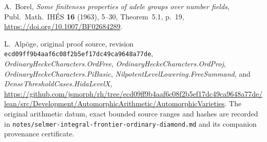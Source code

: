 A.~Borel, \emph{Some finiteness properties of adele groups over
number fields}, Publ.\ Math.\ IH\'ES \textbf{16} (1963), 5--30,
Theorem~5.1, p.~19,
\url{https://doi.org/10.1007/BF02684289}.

L.~Alp\"oge, original proof source, revision
\texttt{ecd09ff9b4aaf6c08f2b5ef17dc49ca9648a77de},
\emph{OrdinaryHeckeCharacters.OrdFree},
\emph{OrdinaryHeckeCharacters.OrdProj},
\emph{OrdinaryHeckeCharacters.PiBasic},
\emph{NilpotentLevelLowering.FreeSummand}, and
\emph{DenseThresholdCases.HidaLevelX},
\url{https://github.com/jsmorph/rh/tree/ecd09ff9b4aaf6c08f2b5ef17dc49ca9648a77de/lean/src/Development/AutomorphicArithmetic/AutomorphicVarieties}.
The original arithmetic datum, exact bounded source ranges and hashes
are recorded in
\texttt{notes/selmer-integral-frontier-ordinary-diamond.md}
and its companion provenance certificate.
